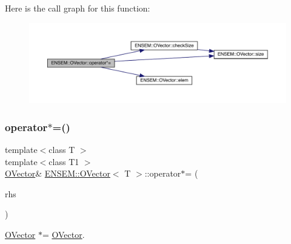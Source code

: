Here is the call graph for this function\+:
\nopagebreak
\begin{figure}[H]
\begin{center}
\leavevmode
\includegraphics[width=350pt]{d0/d8d/classENSEM_1_1OVector_ab1d7773b4a23e20961ece98c90b915b4_cgraph}
\end{center}
\end{figure}
\mbox{\label{classENSEM_1_1OVector_ab1d7773b4a23e20961ece98c90b915b4}} 
\subsubsection{\texorpdfstring{operator$\ast$=()}{operator*=()}\hspace{0.1cm}{\footnotesize\ttfamily [6/6]}}
{\footnotesize\ttfamily template$<$class T $>$ \\
template$<$class T1 $>$ \\
\mbox{\hyperlink{classENSEM_1_1OVector}{O\+Vector}}\& \mbox{\hyperlink{classENSEM_1_1OVector}{E\+N\+S\+E\+M\+::\+O\+Vector}}$<$ T $>$\+::operator$\ast$= (\begin{DoxyParamCaption}\item[{const \mbox{\hyperlink{classENSEM_1_1OVector}{O\+Vector}}$<$ T1 $>$ \&}]{rhs }\end{DoxyParamCaption})\hspace{0.3cm}{\ttfamily [inline]}}



\mbox{\hyperlink{classENSEM_1_1OVector}{O\+Vector}} $\ast$= \mbox{\hyperlink{classENSEM_1_1OVector}{O\+Vector}}. 

